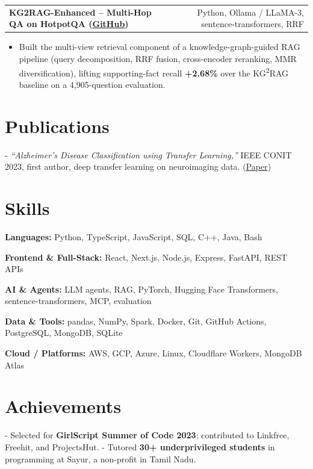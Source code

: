 \documentclass[letterpaper,11pt]{article}
\makeatletter
\newcommand{\projItem}[2]{%
  \vspace{6pt}
  \begin{tabular*}{\textwidth}{@{}l@{\extracolsep{\fill}}r@{}}
    \textbf{#1} & #2 \\
  \end{tabular*}\par\vspace{-2pt}
}
\newcommand{\skillLine}[2]{\textbf{#1:} #2\par\vspace{2pt}}
\newcommand{\inlineBlock}[1]{{\setlength{\leftskip}{0.18in}\small #1\par}}
\makeatother
\begin{document}
\projItem{KG2RAG-Enhanced -- Multi-Hop QA on HotpotQA {\normalfont\small(\href{https://github.com/Deva-1903/KG2RAG-685-NLP}{GitHub})}}{Python, Ollama / LLaMA-3, sentence-transformers, RRF}
\begin{itemize}
  \item Built the multi-view retrieval component of a knowledge-graph-guided RAG pipeline (query decomposition, RRF fusion, cross-encoder reranking, MMR diversification), lifting supporting-fact recall \textbf{+2.68\%} over the KG\textsuperscript{2}RAG baseline on a 4{,}905-question evaluation.
\end{itemize}

\section{Publications}
\inlineBlock{- \textit{``Alzheimer's Disease Classification using Transfer Learning,''} IEEE CONIT 2023, first author, deep transfer learning on neuroimaging data. {\normalfont\small(\href{https://ieeexplore.ieee.org/document/10205760}{Paper})}}

\section{Skills}
\skillLine{Languages}{Python, TypeScript, JavaScript, SQL, C++, Java, Bash}
\skillLine{Frontend \& Full-Stack}{React, Next.js, Node.js, Express, FastAPI, REST APIs}
\skillLine{AI \& Agents}{LLM agents, RAG, PyTorch, Hugging Face Transformers, sentence-transformers, MCP, evaluation}
\skillLine{Data \& Tools}{pandas, NumPy, Spark, Docker, Git, GitHub Actions, PostgreSQL, MongoDB, SQLite}
\skillLine{Cloud / Platforms}{AWS, GCP, Azure, Linux, Cloudflare Workers, MongoDB Atlas}

\section{Achievements}
\inlineBlock{- Selected for \textbf{GirlScript Summer of Code 2023}; contributed to Linkfree, Freehit, and ProjectsHut. - Tutored \textbf{30+ underprivileged students} in programming at Sayur, a non-profit in Tamil Nadu.}
\end{document}
